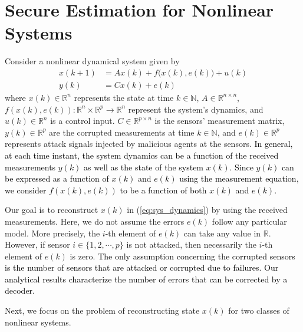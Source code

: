 \section{Secure Estimation for Nonlinear Systems}\label{sec:nonlinear_estimation}
Consider a nonlinear dynamical system given by
\begin{equation}\label{eq:sys_dynamics}
\begin{aligned}
	x(k+1) &= A x (k) + f\big(x(k),e(k)\big) + u(k) \\
	y(k) &= C x(k) + e(k)
\end{aligned}
\end{equation}
where $x(k)\in \mathbb{R}^n$ represents the state at time $k\in
\mathbb{N}$, $A \in \mathbb{R}^{n\times n}$, $f(x(k),e(k)): \mathbb{R}^n \times \mathbb{R}^p \rightarrow \mathbb{R}^n$ represent the system's dynamics, and $u(k) \in \mathbb{R}^n$ is a control input. $C \in \mathbb{R}^{p\times n}$ is the sensors' measurement matrix, $y(k) \in \mathbb{R}^p$ are the corrupted measurements at time $k\in\mathbb{N}$, and $e(k)\in \mathbb{R}^p$ represents attack signals injected by malicious agents at the sensors. \textcolor{black}{In general, at each time instant, the system dynamics can be a function of the received measurements $y(k)$ as well as the state of the system $x(k)$. Since $y(k)$ can be expressed as a function of $x(k)$ and $e(k)$ using the measurement equation, we consider $f(x(k),e(k))$ to be a function of both $x(k)$ and $e(k)$.}



Our goal is to reconstruct $x(k)$ in (\ref{eq:sys_dynamics}) by using the received measurements. Here, we do not assume the errors $e(k)$ follow any particular model. More precisely, the $i$-th element of $e(k)$ can take any value in $\mathbb{R}$. However, if sensor $i\in \{1,2,\cdots,p\}$ is not attacked, then necessarily the $i$-th element of $e(k)$ is zero. \textcolor{black}{The only assumption concerning the corrupted sensors is the number of sensors that are attacked or corrupted due to failures. Our analytical results characterize the number of errors that can be corrected by a decoder.}


Next, we focus on the problem of reconstructing state $x(k)$ for two classes of nonlinear systems. %

